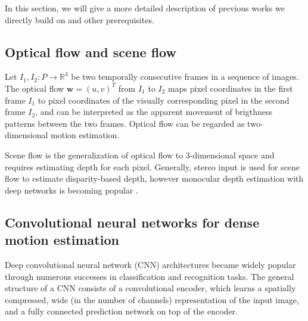 In this section, we will give a more detailed description of previous works
we directly build on and other prerequisites.

\subsection{Optical flow and scene flow}
Let $I_1,I_2 : P \to \mathbb{R}^3$ be two temporally consecutive frames in a
sequence of images.
The optical flow
$\mathbf{w} = (u, v)^T$ from $I_1$ to $I_2$
maps pixel coordinates in the first frame $I_1$ to pixel coordinates of the
visually corresponding pixel in the second frame $I_2$,
and can be interpreted as the apparent movement of brigthness patterns between the two frames.
Optical flow can be regarded as two-dimensional motion estimation.

Scene flow is the generalization of optical flow to 3-dimensional space and
requires estimating depth for each pixel. Generally, stereo input is used for scene flow
to estimate disparity-based depth, however monocular depth estimation with deep networks is becoming
popular \cite{DeeperDepth}.

\subsection{Convolutional neural networks for dense motion estimation}
Deep convolutional neural network (CNN) architectures
\cite{ImageNetCNN, VGGNet, ResNet}
became widely popular through numerous successes in classification and recognition tasks.
The general structure of a CNN consists of a convolutional encoder, which
learns a spatially compressed, wide (in the number of channels) representation of the input image,
and a fully connected prediction network on top of the encoder.

